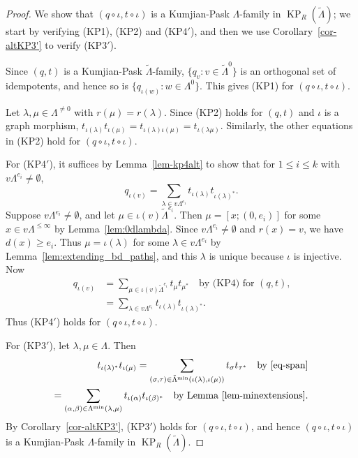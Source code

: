 \documentclass[a4paper,12pt]{amsart}
\numberwithin{equation}{section}
\theoremstyle{definition}
\theoremstyle{remark}
\begin{document}
\begin{proof}
We show that $(q \circ \iota,t \circ \iota)$ is a Kumjian-Pask $\Lambda$-family in  $\operatorname{KP}_R(\tilde{\Lambda})$; 
we start by verifying (KP1), (KP2) and (KP4$'$), and then we use Corollary~\ref{cor-altKP3'} to verify (KP3$'$).

Since $(q,t)$ is a Kumjian-Pask $\tilde{\Lambda}$-family, 
$\{q_v:v \in \tilde{\Lambda}^0\}$ is an orthogonal set of idempotents, and hence so is
$\{q_{\iota(w)}:w \in \Lambda^0\}$. This gives (KP1) for $(q \circ \iota,t \circ \iota)$.

Let $\lambda, \mu \in \Lambda^{\neq 0}$ with $r(\mu)=r(\lambda)$. Since 
(KP2) holds for $(q,t)$ 
and $\iota$ is a graph morphism, 
$t_{\iota(\lambda)} t_{\iota(\mu)} =t_{\iota(\lambda)\iota(\mu)}
= t_{\iota(\lambda\mu)}$.
Similarly, the other equations in (KP2) hold for $(q \circ \iota,t \circ \iota)$.

For (KP4$'$), it suffices by Lemma~\ref{lem-kp4alt} to show that for $1\leq i\leq k$ with
$v\Lambda^{e_i} \neq \emptyset$, 
\begin{equation*}\label{eq-kp4alt}q_{\iota(v)} = \sum_{\lambda \in v\Lambda^{e_i}} t_{\iota(\lambda)}t_{\iota(\lambda)^*}.
\end{equation*}
Suppose $v\Lambda^{e_i}\neq \emptyset$, and let $\mu \in \iota(v){\tilde{\Lambda}}^{e_i}$.  Then $\mu=[x;(0,e_i)]$ for some $x \in v\Lambda^{\leq \infty}$ by Lemma~\ref{lem:0dlambda}. Since $v\Lambda^{e_i}\neq \emptyset$ and $r(x)=v$, we have $d(x)\geq e_i$. Thus $\mu=\iota(\lambda)$ for some $\lambda\in v\Lambda^{e_i}$ by Lemma~\ref{lem:extending_bd_paths}, and this $\lambda$ is unique because $\iota$ is injective.
Now
\begin{align*}
q_{\iota(v)}&= \sum_{\mu \in \iota(v) {\tilde{\Lambda}}^{e_i}} t_\mu t_{\mu^*} 
\quad \text{by (KP4) for $(q,t)$,}\\
&= \sum_{\lambda \in v\Lambda^{e_i}} t_{\iota(\lambda)}t_{\iota(\lambda)^*}.
\end{align*}
Thus (KP4$'$) holds for $(q \circ \iota,t \circ \iota)$.

For (KP3$'$), let  $\lambda,\mu\in\Lambda$. Then 
\begin{align*}
t_{\iota(\lambda)^{*}}t_{\iota(\mu)}=
\sum_{(\sigma,\tau)\in\tilde\Lambda^{\min}(\iota(\lambda),\iota(\mu))}
t_{\sigma} t_{\tau^*} \text{\quad by \eqref{eq-span}}\\
=\sum_{(\alpha,\beta)\in\Lambda^{\min}(\lambda,\mu)}
t_{\iota(\alpha)} t_{\iota(\beta)^*} \text{\quad by Lemma~\ref{lem-minextensions}.}
\end{align*}
By Corollary~\ref{cor-altKP3'}, (KP3$'$) holds for $(q \circ \iota,t \circ \iota)$, and hence
$(q \circ \iota,t \circ \iota)$ is a Kumjian-Pask $\Lambda$-family in $\operatorname{KP}_R(\tilde\Lambda)$.


\end{proof}
\end{document}
